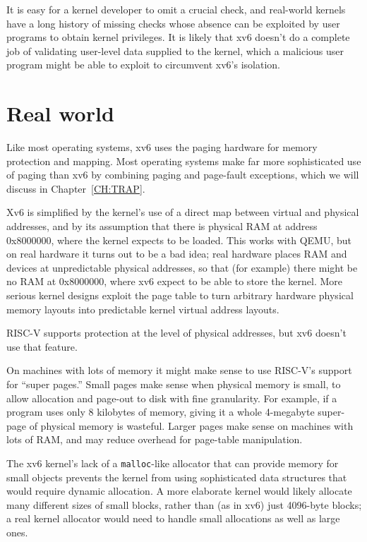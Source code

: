 It is easy for a kernel developer to omit a crucial check, and
real-world kernels have a long history of missing checks whose absence
can be exploited by user programs to obtain kernel privileges.  It is likely that xv6 doesn't do a complete job of validating
user-level data supplied to the kernel, which a malicious user program might be able to exploit to circumvent xv6's isolation.
\section{Real world}

Like most operating systems, xv6 uses the paging hardware for memory
protection and mapping.  Most operating systems make far more
sophisticated use of paging than xv6 by combining paging and
page-fault exceptions, which we will discuss in
Chapter~\ref{CH:TRAP}.

Xv6 is simplified by the kernel's use of a direct map between virtual
and physical addresses, and by its assumption that there is physical
RAM at address 0x8000000, where the kernel expects to be loaded. This
works with QEMU, but on real hardware it turns out to be a bad idea;
real hardware places RAM and devices at unpredictable physical
addresses, so that (for example) there might be no RAM at 0x8000000,
where xv6 expect to be able to store the kernel. More serious kernel
designs exploit the page table to turn arbitrary hardware physical
memory layouts into predictable kernel virtual address layouts.

RISC-V supports protection at the level of physical addresses,
but xv6 doesn't use that feature.

On machines with lots of memory
it might make sense to use
RISC-V's support for ``super pages.''
Small pages make sense
when physical memory is small, to allow allocation and page-out to disk
with fine granularity.
For example, if a program
uses only 8 kilobytes of memory, giving it a whole 4-megabyte super-page
of physical memory is wasteful.
Larger pages make sense on machines with lots of RAM,
and may reduce overhead for page-table manipulation.

The xv6 kernel's lack of a {\tt malloc}-like allocator that can
provide memory for small objects prevents the kernel from using
sophisticated data structures that would require dynamic allocation.
A more elaborate kernel
would likely allocate many different sizes of small blocks,
rather than (as in xv6) just 4096-byte blocks;
a real kernel
allocator would need to handle small allocations as well as large
ones.

